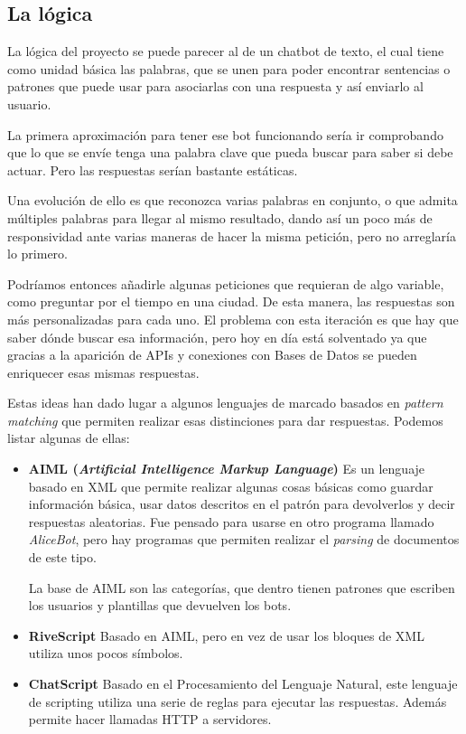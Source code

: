 \subsection{La lógica}

La lógica del proyecto se puede parecer al de un chatbot de texto, el cual tiene como unidad básica las palabras, que se unen para poder encontrar sentencias o patrones que puede usar para asociarlas con una respuesta y así enviarlo al usuario.

La primera aproximación para tener ese bot funcionando sería ir comprobando que lo que se envíe tenga una palabra clave que pueda buscar para saber si debe actuar. Pero las respuestas serían bastante estáticas.

Una evolución de ello es que reconozca varias palabras en conjunto, o que admita múltiples palabras para llegar al mismo resultado, dando así un poco más de responsividad ante varias maneras de hacer la misma petición, pero no arreglaría lo primero.

Podríamos entonces añadirle algunas peticiones que requieran de algo variable, como preguntar por el tiempo en una ciudad. De esta manera, las respuestas son más personalizadas para cada uno. El problema con esta iteración es que hay que saber dónde buscar esa información, pero hoy en día está solventado ya que gracias a la aparición de APIs y conexiones con Bases de Datos se pueden enriquecer esas mismas respuestas.

Estas ideas han dado lugar a algunos lenguajes de marcado basados en \textit{pattern matching} que permiten realizar esas distinciones para dar respuestas. Podemos listar algunas de ellas:
\begin{itemize}
	\item \textbf{AIML (\textit{Artificial Intelligence Markup Language})} \cite{aiml} Es un lenguaje basado en XML que permite realizar algunas cosas básicas como guardar información básica, usar datos descritos en el patrón para devolverlos y decir respuestas aleatorias. Fue pensado para usarse en otro programa llamado \textit{AliceBot}, pero hay programas que permiten realizar el \textit{parsing} de documentos de este tipo.
	
	La base de AIML son las categorías, que dentro tienen patrones que escriben los usuarios y plantillas que devuelven los bots.
	
	\item \textbf{RiveScript} \cite{rivescript} Basado en AIML, pero en vez de usar los bloques de XML utiliza unos pocos símbolos.
	
	\item \textbf{ChatScript} \cite{chatscript} Basado en el Procesamiento del Lenguaje Natural, este lenguaje de scripting utiliza una serie de reglas para ejecutar las respuestas. Además permite hacer llamadas HTTP a servidores.
\end{itemize}

